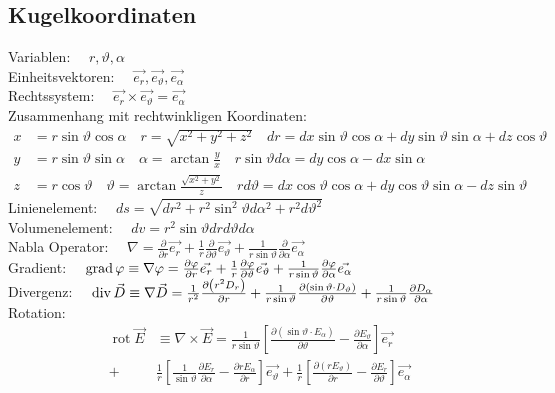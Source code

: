 \subsection{Kugelkoordinaten}
Variablen:          $\quad r, \vartheta, \alpha$\\
Einheitsvektoren:   $\quad \vec{e_{r}}, \vec{e_{\vartheta}}, \vec{e_{\alpha}}$\\
Rechtssystem:       $\quad \vec{e_{r}} \times \vec{e_{\vartheta}}=\vec{e_{\alpha}}$\\
Zusammenhang mit rechtwinkligen Koordinaten:
\begin{align*}
    x&=r \sin \vartheta \cos \alpha \quad r=\sqrt{x^{2}+y^{2}+z^{2}} \quad d r=d x \sin \vartheta \cos \alpha+d y \sin \vartheta \sin \alpha+d z \cos \vartheta\\
    y&=r \sin \vartheta \sin \alpha \quad \alpha=\arctan \frac{y}{x} \quad r \sin \vartheta d \alpha=d y \cos \alpha-d x \sin \alpha\\
    z&=r \cos \vartheta \quad \vartheta=\arctan \frac{\sqrt{x^{2}+y^{2}}}{z} \quad r d \vartheta=d x \cos \vartheta \cos \alpha+d y \cos \vartheta \sin \alpha-d z \sin \vartheta
\end{align*}
Linienelement:      $\quad d s=\sqrt{d r^{2}+r^{2} \sin ^{2} \vartheta d \alpha^{2}+r^{2} d \vartheta^{2}}$\\
Volumenelement:     $\quad d v=r^{2} \sin \vartheta d r d \vartheta d \alpha$\\
Nabla Operator:     $\quad \nabla=\frac{\partial}{\partial r} \vec{e_{r}}+\frac{1}{r} \frac{\partial}{\partial \vartheta} \vec{e_{\vartheta}}+\frac{1}{r \sin \vartheta} \frac{\partial}{\partial \alpha} \vec{e_{\alpha}}$\\
Gradient:           $\quad \operatorname{grad} \varphi \equiv \nabla \varphi=\frac{\partial \varphi}{\partial r} \vec{e_{r}}+\frac{1}{r} \frac{\partial \varphi}{\partial \vartheta} \vec{e_{\vartheta}}+\frac{1}{r \sin \vartheta} \frac{\partial \varphi}{\partial \alpha} \vec{e_{\alpha}}$\\
Divergenz:          $\quad \operatorname{div} \vec{D} \equiv \nabla \vec{D}=\frac{1}{r^{2}} \frac{\partial\left(r^{2} D_{r}\right)}{\partial r}+\frac{1}{r \sin \vartheta} \frac{\partial\left(\sin \vartheta \cdot D_{\vartheta}\right)}{\partial \vartheta}+\frac{1}{r \sin \vartheta} \frac{\partial D_{\alpha}}{\partial \alpha}$\\
Rotation:           
\begin{align*}
    \operatorname{rot} \vec{E} &\equiv \nabla \times \vec{E}= \frac{1}{r \sin \vartheta}\left[\frac{\partial\left(\sin \vartheta \cdot E_{\alpha}\right)}{\partial \vartheta}-\frac{\partial E_{\vartheta}}{\partial \alpha}\right] \vec{e_{r}}\\
        +&\frac{1}{r}\left[\frac{1}{\sin \vartheta} \frac{\partial E_{r}}{\partial \alpha}-\frac{\partial r E_{\alpha}}{\partial r}\right] \vec{e_{\vartheta}}+\frac{1}{r}\left[\frac{\partial\left(r E_{\vartheta}\right)}{\partial r}-\frac{\partial E_{r}}{\partial \vartheta}\right] \vec{e_{\alpha}}
\end{align*}
